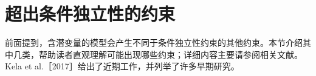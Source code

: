 \section{超出条件独立性的约束}
前面提到，含潜变量的模型会产生不同于条件独立性约束的其他约束。本节介绍其中几类，帮助读者直观理解可能出现哪些约束；详细内容主要请参阅相关文献。Kela et al.［2017］给出了近期工作，并列举了许多早期研究。



